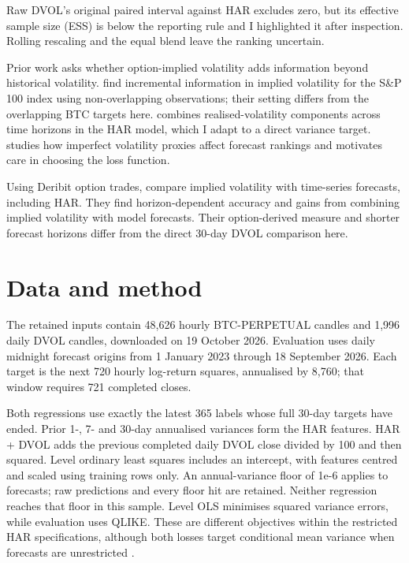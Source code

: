 \documentclass[10pt,a4paper]{article}
\newcommand{\HorizonDays}{30}
\newcommand{\TargetHours}{720}
\newcommand{\AnnualHours}{8{,}760}
\newcommand{\DailyDays}{1}
\newcommand{\WeeklyDays}{7}
\newcommand{\MonthlyDays}{30}
\newcommand{\PercentScale}{100}
\newcommand{\EvaluationStartYear}{2023}
\newcommand{\EvaluationEndYear}{2026}
\newcommand{\RetainedHourlyCandles}{48{,}626}
\newcommand{\RetainedDVOLCandles}{1{,}996}
\newcommand{\DownloadDate}{19 October 2026}
\newcommand{\EvaluationStartDay}{1}
\newcommand{\EvaluationEndDay}{18}
\newcommand{\RequiredCloses}{721}
\newcommand{\TrainingLabels}{365}
\newcommand{\VarianceFloorText}{1e-6}
\newcommand{\SPIndex}{100}
\begin{document}
\begin{samepage}
Raw DVOL's original paired interval against HAR excludes zero, but its effective sample size (ESS) is below the reporting rule and I highlighted it after inspection. Rolling rescaling and the equal blend leave the ranking uncertain.
\end{samepage}

Prior work asks whether option-implied volatility adds information beyond historical volatility. \citet{christensenprabhala} find incremental information in implied volatility for the S\&P \SPIndex{} index using non-overlapping observations; their setting differs from the overlapping BTC targets here. \citet{corsi} combines realised-volatility components across time horizons in the HAR model, which I adapt to a direct variance target. \citet{patton} studies how imperfect volatility proxies affect forecast rankings and motivates care in choosing the loss function.

Using Deribit option trades, \citet{hoangbaur} compare implied volatility with time-series forecasts, including HAR. They find horizon-dependent accuracy and gains from combining implied volatility with model forecasts. Their option-derived measure and shorter forecast horizons differ from the direct \HorizonDays{}-day DVOL comparison here.

\section{Data and method}

The retained inputs contain \RetainedHourlyCandles{} hourly BTC-PERPETUAL candles and \RetainedDVOLCandles{} daily DVOL candles, downloaded on \DownloadDate{}. Evaluation uses daily midnight forecast origins from \EvaluationStartDay{} January \EvaluationStartYear{} through \EvaluationEndDay{} September \EvaluationEndYear{}. Each target is the next \TargetHours{} hourly log-return squares, annualised by \AnnualHours{}; that window requires \RequiredCloses{} completed closes.

Both regressions use exactly the latest \TrainingLabels{} labels whose full \HorizonDays{}-day targets have ended. Prior \DailyDays{}-, \WeeklyDays{}- and \MonthlyDays{}-day annualised variances form the HAR features. HAR + DVOL adds the previous completed daily DVOL close divided by \PercentScale{} and then squared. Level ordinary least squares includes an intercept, with features centred and scaled using training rows only. An annual-variance floor of \VarianceFloorText{} applies to forecasts; raw predictions and every floor hit are retained. Neither regression reaches that floor in this sample. Level OLS minimises squared variance errors, while evaluation uses QLIKE. These are different objectives within the restricted HAR specifications, although both losses target conditional mean variance when forecasts are unrestricted \citep{patton}.
\end{document}
